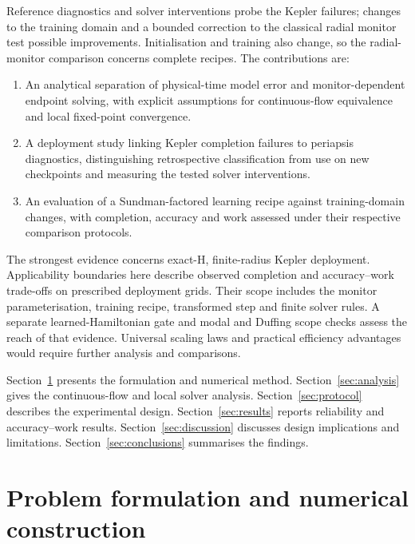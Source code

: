 \documentclass[final,3p,times]{elsarticle}
\begin{document}
Reference diagnostics and solver interventions probe the Kepler failures;
changes to the training domain and a bounded correction to the classical
radial monitor test possible improvements. Initialisation and training
also change, so the radial-monitor comparison concerns complete recipes.
The contributions are:
\begin{enumerate}
 \item An analytical separation of physical-time model error and
 monitor-dependent endpoint solving, with explicit assumptions for
 continuous-flow equivalence and local fixed-point convergence.
 \item A deployment study linking Kepler completion failures to
 periapsis diagnostics, distinguishing retrospective classification
 from use on new checkpoints and measuring the tested solver interventions.
 \item An evaluation of a Sundman-factored learning recipe against
 training-domain changes, with completion, accuracy and work assessed
 under their respective comparison protocols.
\end{enumerate}
The strongest evidence concerns exact-H, finite-radius Kepler deployment.
Applicability boundaries here describe observed completion and
accuracy--work trade-offs on prescribed deployment grids. Their scope
includes the monitor parameterisation, training recipe, transformed step
and finite solver rules. A separate learned-Hamiltonian gate and modal
and Duffing scope checks assess the reach of that evidence. Universal
scaling laws and practical efficiency advantages would require further
analysis and comparisons.

Section~\ref{sec:formulation} presents the formulation and numerical method.
Section~\ref{sec:analysis} gives the continuous-flow and local solver analysis.
Section~\ref{sec:protocol} describes the experimental design.
Section~\ref{sec:results} reports reliability and accuracy--work results.
Section~\ref{sec:discussion} discusses design implications and limitations.
Section~\ref{sec:conclusions} summarises the findings.

\section{Problem formulation and numerical construction}
\label{sec:formulation}
\end{document}
